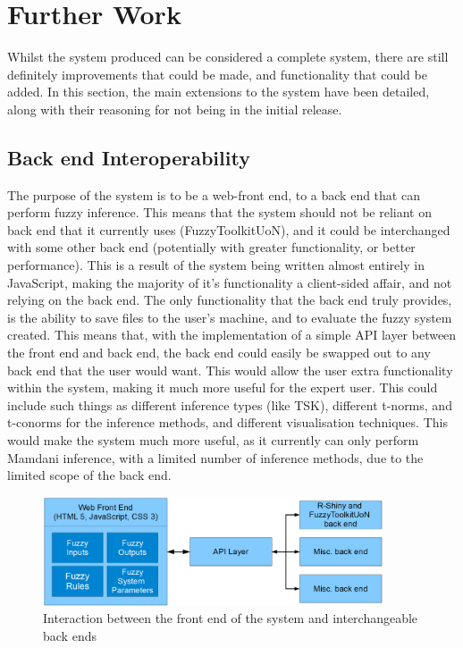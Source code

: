 \section{Further Work}
Whilst the system produced can be considered a complete system, there are still definitely improvements that could be made, and functionality that could be added. In this section, the main extensions to the system have been detailed, along with their reasoning for not being in the initial release. 

\subsection{Back end Interoperability}
The purpose of the system is to be a web-front end, to a back end that can perform fuzzy inference. This means that the system should not be reliant on back end that it currently uses (FuzzyToolkitUoN), and it could be interchanged with some other back end (potentially with greater functionality, or better performance). This is a result of the system being written almost entirely in JavaScript, making the majority of it's functionality a client-sided affair, and not relying on the back end. The only functionality that the back end truly provides, is the ability to save files to the user's machine, and to evaluate the fuzzy system created. This means that, with the implementation of a simple API layer between the front end and back end, the back end could easily be swapped out to any back end that the user would want. This would allow the user extra functionality within the system, making it much more useful for the expert user. This could include such things as different inference types (like TSK), different t-norms, and t-conorms for the inference methods, and different visualisation techniques. This would make the system much more useful, as it currently can only perform Mamdani inference, with a limited number of inference methods, due to the limited scope of the back end.

\begin{figure}[ht!]
	\begin{center}
		\includegraphics[width=0.9\textwidth]{images/archi-new}
	\end{center}
	\vspace{-2mm}
	\caption{Interaction between the front end of the system and interchangeable back ends}
	\label{fig:fw-interop}
	\vspace{-1mm}
\end{figure}

